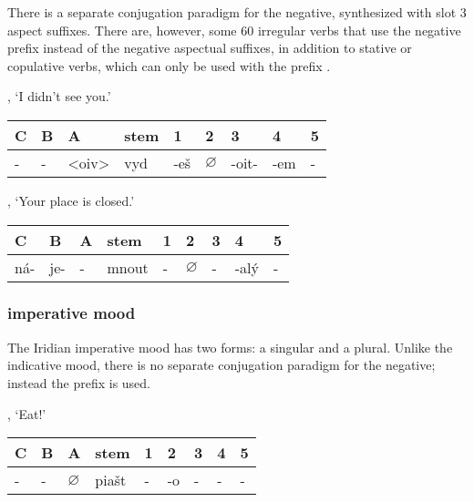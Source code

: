 \xe

\par There is a separate conjugation paradigm for the negative, synthesized with slot 3 aspect suffixes. There are, however, some 60 irregular verbs that use the negative prefix  instead of the negative aspectual suffixes, in addition to stative or copulative verbs, which can only be used with the prefix .

\pex 
\a {}, `I didn't see you.'
\begin{center}
	\small
	\begin{tabu}to \textwidth{MMMM[1.5]MMMMM}
		\toprule
		C&B&A&{\sc stem}&1&2&3&4&5\\
		\midrule
		\addlinespace
		-&-&<oiv>&vyd&-e\v{s}&$\varnothing$&-oit-&-em&-\\
		\bottomrule
	\end{tabu}
\end{center}

\a {}, `Your place is closed.'
\begin{center}
	\small
	\begin{tabu}to \textwidth{MMMM[1.5]MMMMM}
		\toprule
		C&B&A&{\sc stem}&1&2&3&4&5\\
		\midrule
		\addlinespace
		ná-&je-&-&mnout&-&$\varnothing$&-&-alý&-\\
		\bottomrule
	\end{tabu}
\end{center}

\xe

\subsubsection{imperative mood}

\par The Iridian imperative mood has two forms: a singular and a plural. Unlike the indicative mood, there is no separate conjugation paradigm for the negative; instead the prefix  is used.

\pex 
\a {}, `Eat!'
\begin{center}
	\small
	\begin{tabu}to \textwidth{MMMM[1.5]MMMMM}
		\toprule
		C&B&A&{\sc stem}&1&2&3&4&5\\
		\midrule
		\addlinespace
		-&-&$\varnothing$&pia\v{s}t&-&-o&-&-&-\\
		\bottomrule
	\end{tabu}
\end{center}

